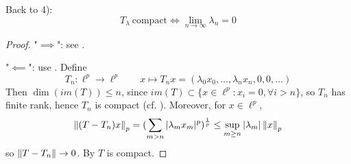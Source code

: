 \documentclass{article}
\begin{document}
\begin{example}
    Back to  4):  
$$
T_\lambda \ \text{compact} \iff \lim_{n\to \infty}\lambda_n=0
$$  
\end{example}

\begin{proof}
    "$\implies$": see .  

    "$\impliedby$": use . Define  
    $$
    T_n: \ell^p \to \ell^p \qquad x \mapsto T_nx=(\lambda_0x_0,\ldots,\lambda_nx_n,0,0,\ldots)
    $$  
    Then $\dim(im(T))\leq n$, since $im(T)\subset \{x\in \ell^p: x_i=0, \forall i>n\}$, so $T_n$ has finite rank, hence $T_n$ is compact (cf. ).  
    Moreover, for $x\in \ell^p$,  
    $$
    \left\|{(T-T_n)x}\right\|_p = (\sum_{m>n} |\lambda_mx_m|^p)^{\frac{1}{p}} \leq \sup_{m\geq n} |\lambda_m| \left\|{x}\right\|_p
    $$  
    so $\left\|{T-T_n}\right\|\to 0$. By  $T$ is compact.
\end{proof}

\begin{example}
    
\end{example}
\end{document}
